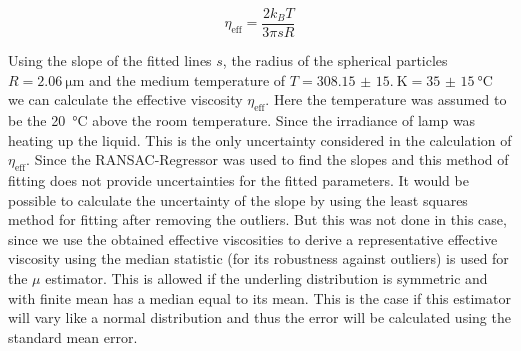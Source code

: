 \documentclass[12pt,english,ngerman]{scrartcl}
\begin{document}
\begin{equation}
	\eta_\text{eff} = \frac{2k_B T}{3\pi s R}
	\label{eq:eff_visc}
\end{equation}

Using the slope of the fitted lines $s$, the radius of the spherical particles
$R=\SI{2.06}{\micro\meter}$ and the medium temperature of
$T=\SI{308.15(15.00)}{\kelvin} = \SI{35(15)}{\celsius}$ we can calculate the
effective viscosity $\eta_\text{eff}$. Here the temperature was assumed to be
the \SI{20}{\celsius} above the room temperature. Since the irradiance of lamp
was heating up the liquid. This is the only uncertainty considered in the
calculation of $\eta_\text{eff}$. Since the RANSAC-Regressor was used to find
the slopes and this method of fitting does not provide uncertainties for the
fitted parameters. It would be possible to calculate the uncertainty of the
slope by using the least squares method for fitting after removing the
outliers. But this was not done in this case, since we use the obtained
effective viscosities to derive a representative effective viscosity using the
median statistic (for its robustness against outliers) is used for the $\mu$
estimator. This is allowed if the underling distribution is symmetric and with
finite mean has a median equal to its mean. This is the case if this estimator
will vary like a normal distribution and thus the error will be calculated
using the standard mean error.
\end{document}
